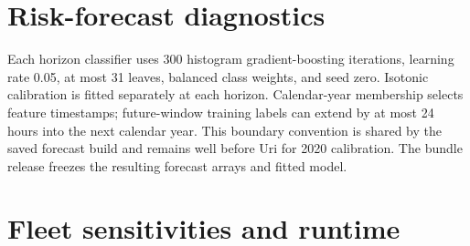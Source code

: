 \section{Risk-forecast diagnostics}
\label{app:hazard}

\begin{table}[htbp]
\centering\small

\caption{Out-of-training-period county classifier diagnostics pooled across the twelve weather-covered Texas counties used to fit/evaluate the forecast. Larger ROC AUC/average precision and smaller Brier score are preferable. Positive prevalence differs by year/horizon. Evaluation fleets use six of these counties. Calibration on 2020 does not imply calibration under later distribution changes.}
\label{tab:hazard}
\end{table}

Each horizon classifier uses 300 histogram gradient-boosting iterations, learning rate 0.05, at most 31 leaves, balanced class weights, and seed zero. Isotonic calibration is fitted separately at each horizon. Calendar-year membership selects feature timestamps; future-window training labels can extend by at most 24 hours into the next calendar year. This boundary convention is shared by the saved forecast build and remains well before Uri for 2020 calibration. The bundle release freezes the resulting forecast arrays and fitted model.
\FloatBarrier

\section{Fleet sensitivities and runtime}
\label{app:structure}

\begin{table}[htbp]
\centering\small

\caption{Six-window fleet sensitivity collection, not annual evaluation. Margin difference is \$/home-week against fixed 20\% under the same scenario and is weighted by duration. Promise pools household episode/failure counts across the six windows. Scenario names specify fleet size, a 70\% Core mix, or 20\% independent per-interval dropout; other settings match the base 100-home scenario. All sampled source pools contain 300 profiles.}
\label{tab:structure}
\end{table}

\begin{table}[htbp]
\centering\small

\caption{Mean CPU wall time per interval for complete forecast/decision/simulation loops, excluding episode reset. Three measured one-day repetitions follow a warm-up for each configuration. The CSV records platform, backend, thread count and all repetitions. DP replans hourly with 32 grid points; PPO acts every interval. These are implementation timings, not communication delays or isolated neural-network inference times.}
\label{tab:latency}
\end{table}
\FloatBarrier


